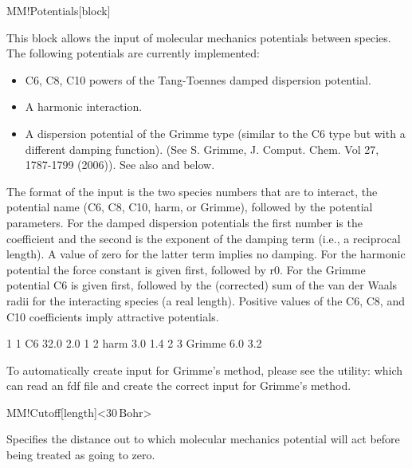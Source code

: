 \begin{fdfentry}{MM!Potentials}[block]

  This block allows the input
  of molecular mechanics potentials between species. The following
  potentials are currently implemented:
  \begin{itemize}
    \item C6, C8, C10 powers of the Tang-Toennes damped dispersion
    potential.
    \item A harmonic interaction.
    \item A dispersion potential of the Grimme type (similar to the C6
    type but with a different damping function). (See S. Grimme,
    J. Comput. Chem. Vol 27, 1787-1799 (2006)). See also
     and  below. 
  \end{itemize}

  The format of the input is the two species numbers that are to
  interact, the potential name (C6, C8, C10, harm, or Grimme), followed
  by the potential parameters. For the damped dispersion potentials the
  first number is the coefficient and the second is the exponent of the
  damping term (i.e., a reciprocal length). A value of zero for the
  latter term implies no damping. For the harmonic potential the force
  constant is given first, followed by r0. For the Grimme potential C6
  is given first, followed by the (corrected) sum of the van der Waals
  radii for the interacting species (a real length). Positive values of
  the C6, C8, and C10 coefficients imply attractive potentials.

  \begin{fdfexample}
      1 1 C6 32.0 2.0
      1 2 harm 3.0 1.4
      2 3 Grimme 6.0 3.2
  \end{fdfexample}

  To automatically create input for Grimme's method, please see the
  utility:  which can read an fdf file and create
  the correct input for Grimme's method.

\end{fdfentry}

\begin{fdfentry}{MM!Cutoff}[length]<$30\,\mathrm{Bohr}$>

  Specifies the distance out to which molecular mechanics
  potential will act before being treated as going to zero.
  
\end{fdfentry}

